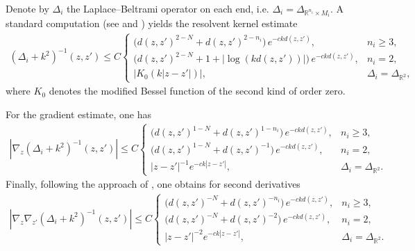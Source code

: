 \documentclass[12pt]{amsart}
\newcommand{\com}[1]{\vskip.3cm
	\fbox{%
		\color{red}
		\parbox{0.93\linewidth}{\footnotesize #1}}
	\vskip.3cm}
\begin{document}
Denote by $\Delta_i$ the Laplace--Beltrami operator on each end, i.e. $\Delta_i = \Delta_{\mathbb{R}^{n_i}\times M_i}$. A standard computation (see \cite[Sec.~2.2]{HS} and \cite[Sec.~2.1]{HNS}) yields the resolvent kernel estimate
\begin{align}\label{eq_reso}
    (\Delta_i+k^2)^{-1}(z,z') \le C \begin{cases}
        \big(d(z,z')^{2-N} + d(z,z')^{2-n_i}\big)\, e^{-ckd(z,z')}, & n_i \geq 3, \\[4pt]
        \big(d(z,z')^{2-N} + 1+|\log(kd(z,z'))|\big)\, e^{-ckd(z,z')}, & n_i = 2, \\[4pt]
        |K_0(k|z-z'|)|, & \Delta_i = \Delta_{\mathbb{R}^2},
    \end{cases}
\end{align}
where $K_0$ denotes the modified Bessel function of the second kind of order zero.  

For the gradient estimate, one has
\begin{align}\label{eq_gradient_reso}
    |\nabla_z (\Delta_i+k^2)^{-1}(z,z')| \le C \begin{cases}
        \big(d(z,z')^{1-N} + d(z,z')^{1-n_i}\big)\, e^{-ckd(z,z')}, & n_i \geq 3, \\[4pt]
        \big(d(z,z')^{1-N} + d(z,z')^{-1}\big)\, e^{-ckd(z,z')}, & n_i = 2, \\[4pt]
        |z-z'|^{-1} e^{-ck|z-z'|}, & \Delta_i = \Delta_{\mathbb{R}^2}.
    \end{cases}
\end{align}
Finally, following the approach of \cite{HS,HNS}, one obtains for second derivatives
\begin{align}\label{dd}
    |\nabla_z \nabla_{z'} (\Delta_i+k^2)^{-1}(z,z')| \le C \begin{cases}
        \big(d(z,z')^{-N} + d(z,z')^{-n_i}\big)\, e^{-ckd(z,z')}, & n_i \geq 3, \\[4pt]
        \big(d(z,z')^{-N} + d(z,z')^{-2}\big)\, e^{-ckd(z,z')}, & n_i = 2, \\[4pt]
        |z-z'|^{-2} e^{-ck|z-z'|}, & \Delta_i = \Delta_{\mathbb{R}^2}.
    \end{cases}
\end{align}





\end{document}
